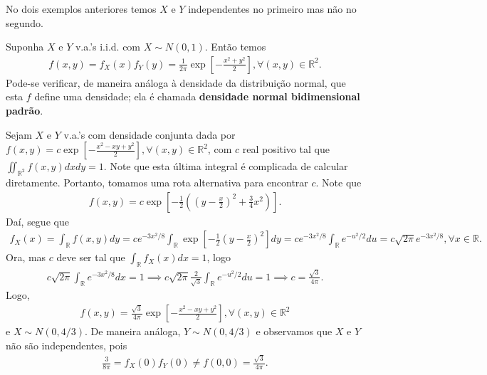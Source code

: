 \documentclass[../Notas.tex]{subfiles}
\begin{document}
\begin{example}
No dois exemplos anteriores temos $X$ e $Y$ independentes no primeiro mas não no segundo.
\end{example}

\begin{example}
Suponha $X$ e $Y$ v.a.'s i.i.d. com $X\sim N(0,1)$. Então temos
\begin{align*}
    f(x,y) = f_X(x)f_Y(y) = \frac{1}{2\pi}\exp[-\frac{x^2+y^2}{2}], \forall (x,y)\in\mathbb{R}^2.
\end{align*}
Pode-se verificar, de maneira análoga à densidade da distribuição normal, que esta $f$ define uma densidade; ela é chamada \textbf{densidade normal bidimensional padrão}.
\end{example}

\begin{example}
Sejam $X$ e $Y$ v.a.'s com densidade conjunta dada por $f(x,y) = \displaystyle{c\exp[-\frac{x^2 - xy + y^2}{2}], \forall (x,y)\in\mathbb{R}^2}$, com $c$ real positivo tal que $\displaystyle{ \iint_{\mathbb{R}^2} f(x,y)dxdy = 1 }$. Note que esta última integral é complicada de calcular diretamente. Portanto, tomamos uma rota alternativa para encontrar $c$. Note que
\begin{align*}
    f(x,y) = c\exp[ -\frac{1}{2}\left( \left(y - \frac{x}{2}\right)^2 + \frac{3}{4}x^2 \right) ].
\end{align*}
Daí, segue que
\begin{align*}
    f_X(x) = \int_{\mathbb{R}} f(x,y)dy = ce^{-3x^2/8}\int_{\mathbb{R}} \exp[ -\frac{1}{2}\left( y - \frac{x}{2} \right)^2 ]dy = ce^{-3x^2/8}\int_{\mathbb{R}} e^{-u^2/2} du = c\sqrt{2\pi}e^{-3x^2/8}, \forall x\in\mathbb{R}.
\end{align*}
Ora, mas $c$ deve ser tal que $\displaystyle{ \int_{\mathbb{R}} f_X(x) dx = 1 }$, logo
\begin{align*}
    c\sqrt{2\pi}\int_{\mathbb{R}} e^{-3x^2/8} dx = 1 \implies c\sqrt{2\pi}\frac{2}{\sqrt{3}}\int_{\mathbb{R}} e^{-u^2/2} du = 1 \implies c = \frac{\sqrt{3}}{4\pi}.
\end{align*}
Logo,
\begin{align*}
    f(x,y) = \displaystyle{\frac{\sqrt{3}}{4\pi}\exp[-\frac{x^2 - xy + y^2}{2}], \forall (x,y)\in\mathbb{R}^2}   
\end{align*}
e $X\sim N(0, 4/3)$. De maneira análoga, $Y\sim N(0, 4/3)$ e observamos que $X$ e $Y$ não são independentes, pois
\begin{align*}
    \frac{3}{8\pi} = f_X(0)f_Y(0) \neq f(0,0) = \frac{\sqrt{3}}{4\pi}.
\end{align*}
\end{example}
\end{document}
